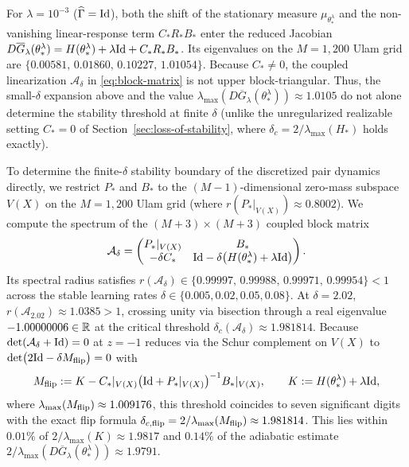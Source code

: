 For $\lambda = 10^{-3}$ ($\widehat{\Gamma}=\mathrm{Id}$), both the shift of the stationary measure $\mu_{\theta_*^\lambda}$ and the non-vanishing linear-response term $C_*R_*B_*$ enter the reduced Jacobian $D\overline G_\lambda(\theta_*^\lambda) = H(\theta_*^\lambda) + \lambda\mathrm{Id} + C_*R_*B_*$. Its eigenvalues on the $M=1{,}200$ Ulam grid are $\{0.00581,\, 0.01860,\, 0.10227,\, 1.01054\}$. Because $C_* \neq 0$, the coupled linearization $\mathcal{A}_\delta$ in \eqref{eq:block-matrix} is not upper block-triangular. Thus, the small-$\delta$ expansion above and the value $\lambda_{\max}(D\overline G_\lambda(\theta_*^\lambda)) \approx 1.0105$ do not alone determine the stability threshold at finite $\delta$ (unlike the unregularized realizable setting $C_*=0$ of Section~\ref{sec:loss-of-stability}, where $\delta_c = 2/\lambda_{\max}(H_*)$ holds exactly).

To determine the finite-$\delta$ stability boundary of the discretized pair dynamics directly, we restrict $P_*$ and $B_*$ to the $(M-1)$-dimensional zero-mass subspace $V(X)$ on the $M=1{,}200$ Ulam grid (where $r(P_*\vert_{V(X)}) \approx 0.8002$). We compute the spectrum of the $(M+3)\times(M+3)$ coupled block matrix
\[
    \mathcal{A}_\delta = \begin{pmatrix} P_*\vert_{V(X)} & B_* \\ -\delta C_* & \mathrm{Id} - \delta\bigl(H(\theta_*^\lambda) + \lambda\mathrm{Id}\bigr) \end{pmatrix}.
\]
Its spectral radius satisfies $r(\mathcal{A}_\delta) \in \{0.99997,\, 0.99988,\, 0.99971,\, 0.99954\} < 1$ across the stable learning rates $\delta \in \{0.005, 0.02, 0.05, 0.08\}$. At $\delta=2.02$, $r(\mathcal{A}_{2.02}) \approx 1.0385 > 1$, crossing unity via bisection through a real eigenvalue $-1.00000006 \in \mathbb{R}$ at the critical threshold $\delta_c(\mathcal{A}_\delta) \approx 1.981814$. Because $\det(\mathcal{A}_\delta + \mathrm{Id}) = 0$ at $z=-1$ reduces via the Schur complement on $V(X)$ to $\det\bigl(2\mathrm{Id} - \delta M_{\rm flip}\bigr) = 0$ with
\[
    M_{\rm flip} := K - C_*\vert_{V(X)}\bigl(\mathrm{Id} + P_*\vert_{V(X)}\bigr)^{-1} B_*\vert_{V(X)},
    \qquad
    K := H(\theta_*^\lambda) + \lambda\mathrm{Id},
\]
where $\lambda_{\max}(M_{\rm flip}) \approx 1.009176$, this threshold coincides to seven significant digits with the exact flip formula $\delta_{c,{\rm flip}} = 2/\lambda_{\max}(M_{\rm flip}) \approx 1.981814$. This lies within $0.01\%$ of $2/\lambda_{\max}(K) \approx 1.9817$ and $0.14\%$ of the adiabatic estimate $2/\lambda_{\max}(D\overline G_\lambda(\theta_*^\lambda)) \approx 1.9791$.

